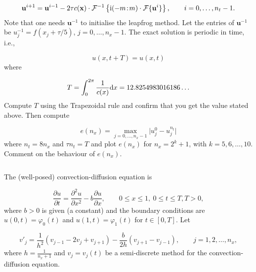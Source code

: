\documentclass[12pt,a4paper]{article}
\begin{document}
\[
\mathbf{u}^{i+1} = \mathbf{u}^{i-1} - 2\tau c(\mathbf{x})\cdot\mathcal{F}^{-1}\left\lbrace {\rm i}(-m\!:\!m)\cdot\mathcal{F}\lbrace \mathbf{u}^{i} \rbrace\right\rbrace, \qquad i = 0, \ldots, n_t-1.
\]
Note that one needs $\mathbf{u}^{-1}$ to initialise the leapfrog method.  Let the entries of $\mathbf{u}^{-1}$ be $u^{-1}_j = f(x_j + \tau/5)$, $j = 0, \ldots, n_x-1$.  The exact solution is periodic in time, i.e.,

\[
   u(x,t+T) = u(x,t)
\]
where

\[
   T = \int_{0}^{2\pi}\frac{1}{c(x)}{\rm d}x = 12.8254983016186\ldots
\]
Compute $T$ using the Trapezoidal rule and confirm that you get the value stated above.  Then compute

\[
   e(n_x) = \max_{j = 0, \ldots, n_x-1} \vert u^{0}_j - u^{n_t}_{j} \vert
\]
where $n_t = 8n_x$ and $\tau n_t = T$  and plot $e(n_x)$ for $n_x = 2^k + 1$, with $k = 5, 6, \ldots, 10$.  Comment on the behaviour of $e(n_x)$.


\begin{lstlisting}

\end{lstlisting}

The (well-posed) convection-diffusion equation is 

\[
\frac{\partial u}{\partial t} = \frac{\partial^2 u}{\partial x^2} - b \frac{\partial u}{\partial x}, \qquad 0 \leq x \leq 1, \: 0 \leq t \leq T, T > 0,
\]
where $b > 0$ is given (a constant) and the boundary conditions are $u(0,t) = \varphi_0(t)$ and $u(1,t) = \varphi_1(t)$ for $t \in [0, T]$.  Let 

\[
v'_j = \frac{1}{h^2}\left(v_{j-1} - 2v_j + v_{j+1}   \right) - \frac{b}{2h}\left(v_{j+1}  - v_{j-1}   \right), \qquad j =  1, 2,  \ldots, n_x,
\]
where $h = \displaystyle{\frac{1}{n_x + 1}}$ and $v_j = v_j(t)$ be a semi-discrete method for the convection-diffusion equation.
\end{document}
